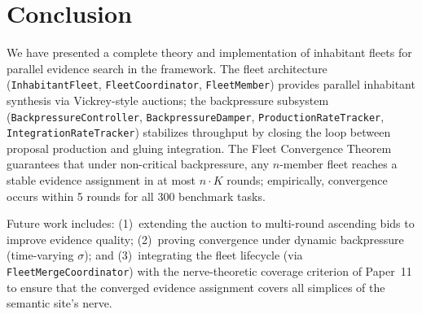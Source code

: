 \documentclass[11pt]{article}
\providecommand{\instab}{\sigma}                   %
\providecommand{\FleetPY}{\texttt{InhabitantFleet}}
\providecommand{\CoordPY}{\texttt{FleetCoordinator}}
\providecommand{\MemberPY}{\texttt{FleetMember}}
\providecommand{\BPCtrlPY}{\texttt{BackpressureController}}
\providecommand{\DamperPY}{\texttt{BackpressureDamper}}
\providecommand{\ProdPY}{\texttt{ProductionRateTracker}}
\providecommand{\IntPY}{\texttt{IntegrationRateTracker}}
\providecommand{\MergePY}{\texttt{FleetMergeCoordinator}}
\begin{document}
\section{Conclusion}\label{sec:conclusion}

We have presented a complete theory and implementation of inhabitant fleets
for parallel evidence search in the \JuGeo{} framework.  The fleet
architecture (\FleetPY{}, \CoordPY{}, \MemberPY{}) provides parallel
inhabitant synthesis via Vickrey-style auctions; the backpressure subsystem
(\BPCtrlPY{}, \DamperPY{}, \ProdPY{}, \IntPY{}) stabilizes throughput by
closing the loop between proposal production and gluing integration.  The
Fleet Convergence Theorem guarantees that under non-critical backpressure,
any $n$-member fleet reaches a stable evidence assignment in at most $n \cdot K$
rounds; empirically, convergence occurs within 5 rounds for all 300 benchmark
tasks.

Future work includes: (1)~extending the auction to multi-round ascending bids
to improve evidence quality; (2)~proving convergence under dynamic backpressure
(time-varying $\instab$); and (3)~integrating the fleet lifecycle (via
\MergePY{}) with the nerve-theoretic coverage criterion of Paper~11 to ensure
that the converged evidence assignment covers all simplices of the semantic
site's nerve.
\end{document}
